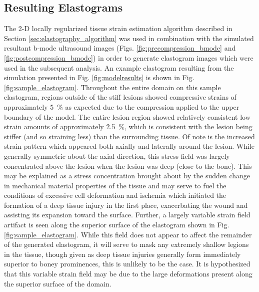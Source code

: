 		\subsection{Resulting Elastograms}
			\label{sec:elastogram}
			The 2-D locally regularized tissue strain estimation algorithm described in Section \ref{sec:elastography_algorithm} was used in combination with the simulated resultant b-mode ultrasound images (Figs. \ref{fig:precompression_bmode} and \ref{fig:postcompression_bmode}) in order to generate elastogram images which were used in the subsequent analysis. An example elastogram resulting from the simulation presented in Fig. \ref{fig:modelresults} is shown in Fig. \ref{fig:sample_elastogram}. Throughout the entire domain on this sample elastogram, regions outside of the stiff lesions showed compressive strains of approximately \SI{5}{\percent} as expected due to the compression applied to the upper boundary of the model. The entire lesion region showed relatively consistent low strain amounts of approximately \SI{2.5}{\percent}, which is consistent with the lesion being stiffer (and so straining less) than the surrounding tissue. Of note is the increased strain pattern which appeared both axially and laterally around the lesion. While generally symmetric about the axial direction, this stress field was largely concentrated above the lesion when the lesion was deep (close to the bone). This may be explained as a stress concentration brought about by the sudden change in mechanical material properties of the tissue and may serve to fuel the conditions of excessive cell deformation and ischemia which initiated the formation of a deep tissue injury in the first place, exacerbating the wound and assisting its expansion toward the surface. Further, a largely variable strain field artifact is seen along the superior surface of the elastogram shown in Fig. \ref{fig:sample_elastogram}. While this field does not appear to affect the remainder of the generated elastogram, it will serve to mask any extremely shallow legions in the tissue, though given as deep tissue injuries generally form immediately superior to boney prominences, this is unlikely to be the case. It is hypothesized that this variable strain field may be due to the large deformations present along the superior surface of the domain.

